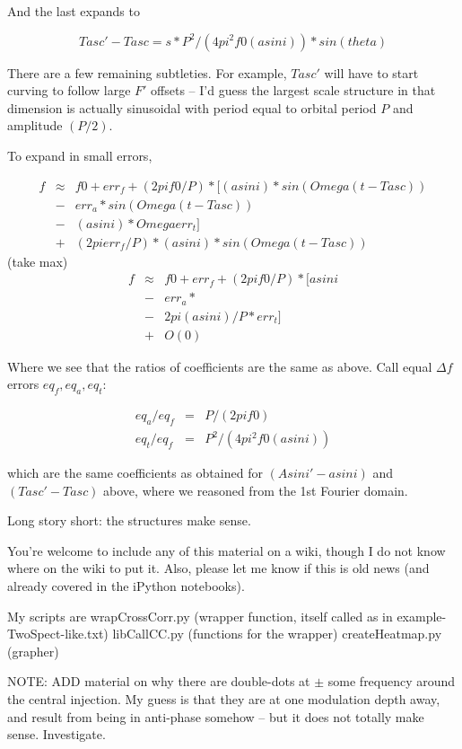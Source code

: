 \documentclass{article}
\begin{document}
And the last expands to

\begin{equation}
Tasc' - Tasc     = s * P^2/(4 pi^2 f0 (a sin i)) * sin(theta)
\end{equation}

There are a few remaining subtleties. For example, $Tasc'$ will have to
start curving to follow large $F'$ offsets -- I'd guess the largest scale
structure in that dimension is actually sinusoidal with period equal to
orbital period $P$ and amplitude $(P/2)$.

To expand in small errors,

\begin{eqnarray}
f &\approx& f0 + err_f + (2pi f0/P)*[
                     (a sin i)*sin(Omega(t-Tasc)) \\
                   &-& err_a * sin(Omega(t-Tasc)) \\
                   &-& (a sin i) * Omega err_t] \\
                   &+& (2pi err_f/P)*(a sin i)*sin(Omega(t-Tasc))
\end{eqnarray}
  (take max)
\begin{eqnarray}
f &\approx& f0 + err_f + (2pi f0/P)*[
                     a sin i \\ 
                   &-& err_a * \\
                   &-& 2 pi (a sin i)/P * err_t] \\
                   &+& O(0)
\end{eqnarray}

Where we see that the ratios of coefficients are the same as above. Call
equal $\Delta f$ errors $eq_f, eq_a, eq_t$:

\begin{eqnarray}
eq_a / eq_f &=& P / (2 pi f0)\\
eq_t / eq_f &=& P^2/(4 pi^2 f0 (a sin i))
\end{eqnarray}

which are the same coefficients as obtained for $(Asini' - a sin i)$ and
$(Tasc' - Tasc)$ above, where we reasoned from the 1st Fourier domain.

Long story short: the structures make sense.

You're welcome to include any of this material on a wiki, though I do
not know where on the wiki to put it. Also, please let me know if this
is old news (and already covered in the iPython notebooks).

My scripts are
    wrapCrossCorr.py
      (wrapper function, itself called as in example-TwoSpect-like.txt)
    libCallCC.py
      (functions for the wrapper)
    createHeatmap.py
      (grapher)

NOTE: ADD material on why there are double-dots at $\pm$ some frequency around the central injection. My guess is that they are at one modulation depth away, and result from being in anti-phase somehow -- but it does not totally make sense. Investigate.
\end{document}
